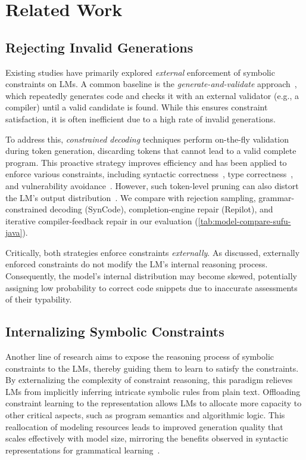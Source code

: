 
\section{Related Work}\label{sec:related}

\subsection{Rejecting Invalid Generations}
Existing studies have primarily explored \emph{external} enforcement of symbolic constraints on LMs.
%
A common baseline is the \emph{generate-and-validate} approach~\cite{DBLP:conf/sigsoft/ZhuSXZY0Z21,DBLP:conf/popl/LongR16}, which repeatedly generates code and checks it with an external validator (e.g., a compiler) until a valid candidate is found. While this ensures constraint satisfaction, it is often inefficient due to a high rate of invalid generations.

To address this, \emph{constrained decoding} techniques perform on-the-fly validation during token generation, discarding tokens that cannot lead to a valid complete program. This proactive strategy improves efficiency and has been applied to enforce various constraints, including syntactic correctness~\cite{ugare2024syncodellmgenerationgrammar}, type correctness~\cite{DBLP:journals/corr/abs-2504-09246}, and vulnerability avoidance~\cite{DBLP:conf/issre/StorhaugLH23}. However, such token-level pruning can also distort the LM's output distribution~\cite{DBLP:conf/nips/ParkWBPD24}. We compare with rejection sampling, grammar-constrained decoding (SynCode), completion-engine repair (Repilot), and iterative compiler-feedback repair in our evaluation (\autoref{tab:model-compare-sufu-java}).

Critically, both strategies enforce constraints \emph{externally}. As discussed, externally enforced constraints do not modify the LM's internal reasoning process. Consequently, the model's internal distribution may become skewed, potentially assigning low probability to correct code snippets due to inaccurate assessments of their typability.

\subsection{Internalizing Symbolic Constraints}
Another line of research aims to expose the reasoning process of symbolic constraints to the LMs, thereby guiding them to learn to satisfy the constraints.
%
By externalizing the complexity of constraint reasoning, this paradigm relieves LMs from implicitly inferring intricate symbolic rules from plain text. Offloading constraint learning to the representation allows LMs to allocate more capacity to other critical aspects, such as program semantics and algorithmic logic. This reallocation of modeling resources leads to improved generation quality that scales effectively with model size, mirroring the benefits observed in syntactic representations for grammatical learning~\cite{DBLP:conf/acl/LiangZ0LLXCZZZC25}.

